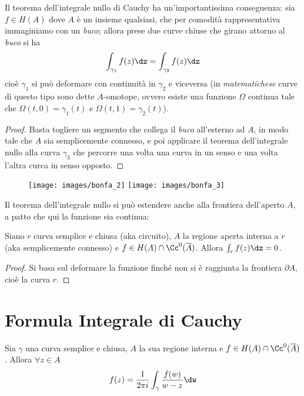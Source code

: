 Il teorema dell'integrale nullo di Cauchy ha un'importantissima conseguenza: sia $f\in H(A)$ dove $A$ è un insieme qualsiasi, che per comodità rappresentativa immaginiamo con un \textit{buco}; allora prese due curve chiuse che girano attorno al \textit{buco} si ha
\begin{equation*}
\int_{\gamma_1}f(z)\dz=\int_{\gamma_2}f(z)\dz
\end{equation*}
cioè $\gamma_1$ si può deformare con continuità in $\gamma_2$ e viceversa (in \textit{matematichese} curve di questo tipo sono dette $A$-omotope, ovvero esiste una funzione $\Omega$ continua tale che $\Omega(t,0)=\gamma_1(t)$ e $\Omega(t,1)=\gamma_2(t)$).

\begin{proof}
Basta togliere un segmento che collega il \textit{buco} all'esterno ad $A$, in modo tale che $A$ sia semplicemente connesso, e poi applicare il teorema dell'integrale nullo alla curva $\gamma_3$ che percorre una volta una curva in un senso e una volta l'altra curca in senso opposto.
\end{proof}

\begin{figure}[h!]
\begin{center}
  \texttt{[image: images/bonfa\_2]}
  \texttt{[image: images/bonfa\_3]}
\end{center}
\end{figure}

Il teorema dell'integrale nullo si può estendere anche alla frontiera dell'aperto $A$, a patto che qui la funzione sia continua:
\begin{thm}
Siano $r$ curva semplice e chiusa (aka circuito), $A$ la regione aperta interna a $r$ (aka semplicemente connesso) e $f\in H(A)\cap\Cc^0(\overline{A})$. Allora $\int_r f(z)\dz=0$.
\end{thm}
\begin{proof}
Si basa sul deformare la funzione finché non si è raggiunta la frontiera $\partial A$, cioè la curva $r$.
\end{proof}

\section{Formula Integrale di Cauchy}

\begin{thm}
Sia $\gamma$ una curva semplice e chiusa, $A$ la sua regione interna e $f\in H(A) \cap \Cc^{0}(\overline{A})$. Allora $\forall z\in A$
\begin{equation*}
f(z) = \frac{1}{2\pi i}\int_{\gamma}\frac{f(w)}{w - z} \dw
\end{equation*}
\end{thm}

